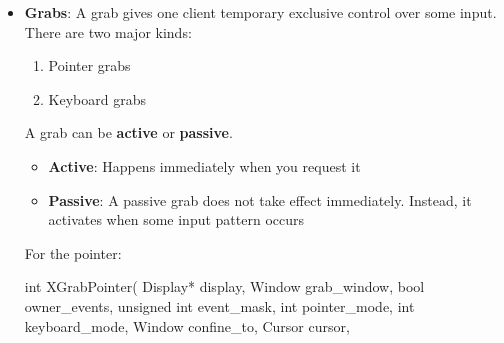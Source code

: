 \documentclass{report}
\begin{document}
\begin{itemize}
            This is why selections are more like negotiated inter-client data transfer than a simple global clipboard buffer.
            \bigbreak \noindent 
            The main events are 
            \bigbreak \noindent 
            \begin{cppcode}
            SelectionClear
            SelectionRequest
            SelectionNotify
            \end{cppcode}
            \bigbreak \noindent
            \begin{itemize}
                \item \textbf{SelectionClear}: You lost ownership of the selection.
                \item \textbf{SelectionRequest}: Another client is asking you for the selection data.
                \item \textbf{SelectionNotify}: The selection conversion request completed.
            \end{itemize}
            A correct clipboard owner must handle \textbf{SelectionRequest.} If it exits, the selected data may disappear unless a clipboard manager has saved it.           
        \item \textbf{Grabs}: A grab gives one client temporary exclusive control over some input.
            \bigbreak \noindent 
            There are two major kinds:
            \begin{enumerate}
                \item Pointer grabs
                \item Keyboard grabs
            \end{enumerate}
            A grab can be \textbf{active} or \textbf{passive}. 
            \begin{itemize}
                \item \textbf{Active}: Happens immediately when you request it 
                \item \textbf{Passive}: A passive grab does not take effect immediately. Instead, it activates when some input pattern occurs
            \end{itemize}
            For the pointer:
            \bigbreak \noindent 
            \begin{cppcode}
            int XGrabPointer(
                Display* display,
                Window grab_window,
                bool owner_events,
                unsigned int event_mask,
                int pointer_mode,
                int keyboard_mode,
                Window confine_to,
                Cursor cursor,

\end{cppcode}
\end{itemize}
\end{document}
